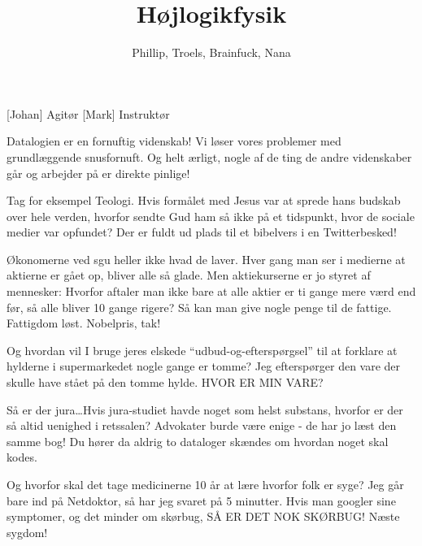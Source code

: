 \documentclass[a4paper,11pt]{article}
\title{Højlogikfysik}
\author{Phillip, Troels, Brainfuck, Nana}
\begin{document}
\maketitle
\begin{roles}
  [Johan] Agitør
  [Mark] Instruktør
\end{roles}

\begin{props}
\end{props}

\begin{sketch}



 Datalogien er en fornuftig videnskab! Vi løser vores
problemer med grundlæggende snusfornuft. Og helt ærligt, nogle af de
ting de andre videnskaber går og arbejder på er direkte pinlige!

 Tag for eksempel Teologi. Hvis formålet med Jesus var at
sprede hans budskab over hele verden, hvorfor sendte Gud ham så ikke
på et tidspunkt, hvor de sociale medier var opfundet?  Der er fuldt ud
plads til et bibelvers i en Twitterbesked!

 Økonomerne ved sgu heller ikke hvad de laver. Hver gang man
ser i medierne at aktierne er gået op, bliver alle så
glade. Men aktiekurserne er jo styret af mennesker: Hvorfor aftaler man
ikke bare at alle aktier er ti gange mere værd end før, så alle bliver
10 gange rigere? Så kan man give nogle penge til de fattige.  Fattigdom
løst. Nobelpris, tak! 

 Og hvordan vil I bruge jeres elskede ``udbud-og-efterspørgsel''
til at forklare at hylderne i supermarkedet nogle gange er tomme?  Jeg
efterspørger den vare der skulle have stået på den tomme hylde.  HVOR
ER MIN VARE?

 Så er der jura\ldots Hvis jura-studiet havde noget som helst
substans, hvorfor er der så altid uenighed i retssalen?  Advokater
burde være enige - de har jo læst den samme bog! Du hører da aldrig to
dataloger skændes om hvordan noget skal kodes.

 Og hvorfor skal det tage medicinerne 10 år at lære hvorfor
folk er syge?  Jeg går bare ind på Netdoktor, så har jeg svaret på 5
minutter. Hvis man googler sine symptomer, og det minder om skørbug,
SÅ ER DET NOK SKØRBUG!  Næste sygdom!


\end{sketch}
\end{document}
